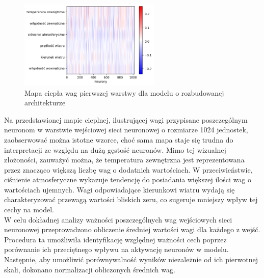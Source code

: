 \documentclass[a4paper,twoside,12pt]{book}
\begin{document}
\begin{figure}[!h]
  \centering
  \includegraphics[width=0.6\textwidth]{img/heatmap2.png}
  \caption{Mapa ciepła wag pierwszej warstwy dla modelu o rozbudowanej architekturze}
  \label{fig:etykieta-rysunku}
\end{figure}

Na przedstawionej mapie cieplnej, ilustrującej wagi przypisane poszczególnym neuronom w warstwie wejściowej sieci neuronowej o rozmiarze 1024 jednostek, zaobserwować można istotne wzorce, choć sama mapa staje się trudna do interpretacji ze względu na dużą gęstość neuronów. Mimo tej wizualnej złożoności, zauważyć można, że temperatura zewnętrzna jest reprezentowana przez znacząco większą liczbę wag o dodatnich wartościach. W przeciwieństwie, ciśnienie atmosferyczne wykazuje tendencję do posiadania większej ilości wag o wartościach ujemnych. Wagi odpowiadające kierunkowi wiatru wydają się charakteryzować przewagą wartości bliskich zeru, co sugeruje mniejszy wpływ tej cechy na model.\\

W celu dokładnej analizy ważności poszczególnych wag wejściowych sieci neuronowej przeprowadzono obliczenie średniej wartości wagi dla każdego z wejść. Procedura ta umożliwiła identyfikację względnej ważności cech poprzez porównanie ich przeciętnego wpływu na aktywację neuronów w modelu. Następnie, aby umożliwić porównywalność wyników niezależnie od ich pierwotnej skali, dokonano normalizacji obliczonych średnich wag.
\end{document}
